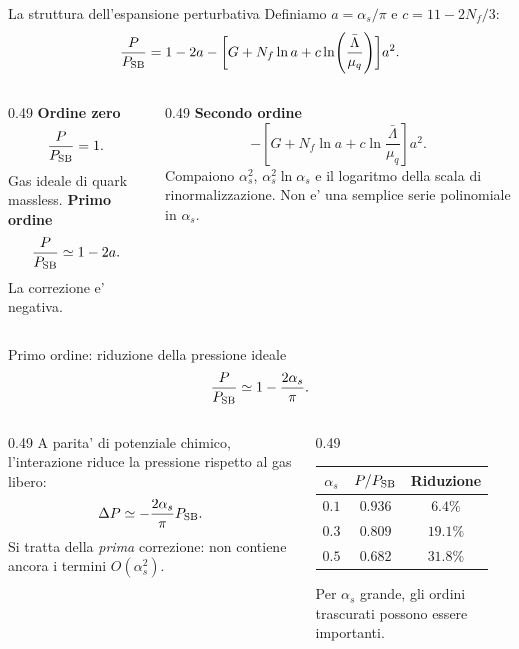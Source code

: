 \begin{frame}{La struttura dell'espansione perturbativa}
\small
Definiamo $a=\alpha_s/\pi$ e $c=11-2N_f/3$:
\[
\frac{P}{P_{\rm SB}}
=1-2a-\biggl[G+N_f\ln a+c\ln\!\left(\frac{\bar\Lambda}{\mu_q}\right)\biggr]a^2.
\]
\begin{columns}[T,onlytextwidth]
\begin{column}{0.49\textwidth}
\textbf{Ordine zero}
\[
\frac{P}{P_{\rm SB}}=1.
\]
Gas ideale di quark massless.
\medskip
\textbf{Primo ordine}
\[
\frac{P}{P_{\rm SB}}\simeq1-2a.
\]
La correzione e' negativa.
\end{column}
\begin{column}{0.49\textwidth}
\textbf{Secondo ordine}
\[
-\left[G+N_f\ln a+c\ln\frac{\bar\Lambda}{\mu_q}\right]a^2.
\]
Compaiono $\alpha_s^2$, $\alpha_s^2\ln\alpha_s$
e il logaritmo della scala di rinormalizzazione.
\medskip
Non e' una semplice serie polinomiale in $\alpha_s$.
\end{column}
\end{columns}
\end{frame}

\begin{frame}{Primo ordine: riduzione della pressione ideale}
\small
\[
\frac{P}{P_{\rm SB}}\simeq1-\frac{2\alpha_s}{\pi}.
\]
\begin{columns}[T,onlytextwidth]
\begin{column}{0.49\textwidth}
A parita' di potenziale chimico, l'interazione
riduce la pressione rispetto al gas libero:
\[
\Delta P\simeq-
\frac{2\alpha_s}{\pi}P_{\rm SB}.
\]
Si tratta della \emph{prima} correzione:
non contiene ancora i termini $O(\alpha_s^2)$.
\end{column}
\begin{column}{0.49\textwidth}
\begin{tabular}{c|c|c}
$\alpha_s$ & $P/P_{\rm SB}$ & Riduzione\\ \hline
$0.1$ & $0.936$ & $6.4\%$\\
$0.3$ & $0.809$ & $19.1\%$\\
$0.5$ & $0.682$ & $31.8\%$
\end{tabular}
\medskip
Per $\alpha_s$ grande, gli ordini trascurati
possono essere importanti.
\end{column}
\end{columns}
\end{frame}

